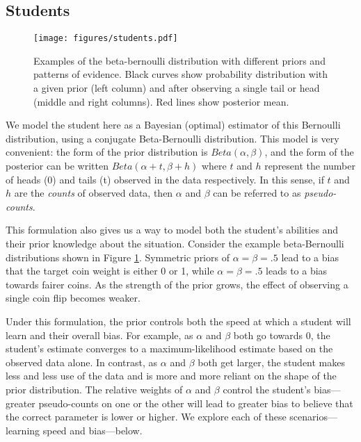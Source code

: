 \documentclass[10pt,letterpaper]{article}
\begin{document}
\subsection{Students}

\begin{figure}[t]
\begin{center}
\texttt{[image: figures/students.pdf]}
\end{center}
\caption{\label{fig:students} Examples of the beta-bernoulli distribution with different priors and patterns of evidence. Black curves show probability distribution with a given prior (left column) and after observing a single tail or head (middle and right columns). Red lines show posterior mean.}
\end{figure}

We model the student here as a Bayesian (optimal) estimator of this Bernoulli distribution, using a conjugate Beta-Bernoulli distribution. This model is very convenient: the form of the prior distribution is $Beta(\alpha,\beta)$, and the form of the posterior can be written $Beta(\alpha+t,\beta+h)$ where $t$ and $h$ represent the number of heads (0) and tails (t) observed in the data respectively. In this sense, if $t$ and $h$ are the \emph{counts} of observed data, then $\alpha$ and $\beta$ can be referred to as \emph{pseudo-counts}.

This formulation also gives us a way to model both the student's abilities and their prior knowledge about the situation. Consider the example beta-Bernoulli distributions shown in Figure \ref{fig:students}. Symmetric priors of $\alpha=\beta=.5$ lead to a bias that the target coin weight is either 0 or 1, while $\alpha=\beta=.5$ leads to a bias towards fairer coins. As the strength of the prior grows, the effect of observing a single coin flip becomes weaker. 

Under this formulation, the prior controls both the speed at which a student will learn and their overall bias. For example, as $\alpha$ and $\beta$ both go towards 0, the student's estimate converges to a maximum-likelihood estimate based on the observed data alone. In contrast, as $\alpha$ and $\beta$ both get larger, the student makes less and less use of the data and is more and more reliant on the shape of the prior distribution. The relative weights of $\alpha$ and $\beta$ control the student's bias---greater pseudo-counts on one or the other will lead to greater bias to believe that the correct parameter is lower or higher. We explore each of these scenarios---learning speed and bias---below.
\end{document}
